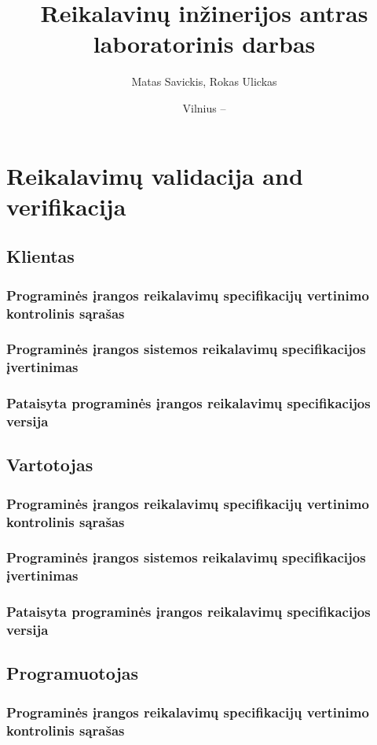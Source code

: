 \documentclass{VUMIFPSkursinis}
\title{Reikalavinų inžinerijos antras laboratorinis darbas}
\author{Matas Savickis, Rokas Ulickas}
\date{Vilnius – \the\year}
\begin{document}
\maketitle


\tableofcontents

	\section{Reikalavimų validacija and verifikacija}
		\subsection{Klientas}
			\subsubsection{Programinės įrangos reikalavimų specifikacijų vertinimo kontrolinis sąrašas}
			\subsubsection{Programinės įrangos sistemos reikalavimų specifikacijos įvertinimas}
			\subsubsection{Pataisyta programinės įrangos reikalavimų specifikacijos versija}
		\subsection{Vartotojas}
			\subsubsection{Programinės įrangos reikalavimų specifikacijų vertinimo kontrolinis sąrašas}
			\subsubsection{Programinės įrangos sistemos reikalavimų specifikacijos įvertinimas}
			\subsubsection{Pataisyta programinės įrangos reikalavimų specifikacijos versija}
		\subsection{Programuotojas}
			\subsubsection{Programinės įrangos reikalavimų specifikacijų vertinimo kontrolinis sąrašas}
\end{document}
